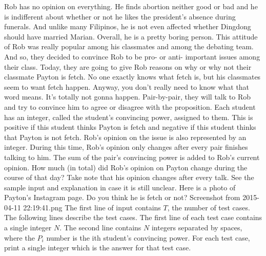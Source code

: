 Rob has no opinion on everything. He finds abortion neither good or bad and he is indifferent about whether or not he likes the president's absence during funerals. And unlike many Filipinos, he is not even affected whether Dingdong should have married Marian. Overall, he is a pretty boring person.
\newline\newline
This attitude of Rob was really popular among his classmates and among the debating team. And so, they decided to convince Rob to be pro- or anti- important issues among their class. Today, they are going to give Rob reasons on why or why not their classmate Payton is fetch. No one exactly knows what fetch is, but his classmates seem to want fetch happen. Anyway, you don't really need to know what that word means. It's totally not gonna happen.
\newline\newline
Pair-by-pair, they will talk to Rob and try to convince him to agree or disagree with the proposition. Each student has an integer, called the student's convincing power, assigned to them. This is positive if this student thinks Payton is fetch and negative if this student thinks that Payton is not fetch. Rob's opinion on the issue is also represented by an integer. During this time, Rob's opinion only changes after every pair finishes talking to him. The sum of the pair's convincing power is added to Rob's current opinion.
\newline\newline
How much (in total) did Rob's opinion on Payton change during the course of that day? Take note that his opinion changes after every talk. See the sample input and explanation in case it is still unclear.
\newline\newline
Here is a photo of Payton's Instagram page. Do you think he is fetch or not? Screenshot from 2015-04-11 22:19:41.png
\newline\newline
The first line of input contains $T$, the number of test cases. The following lines describe the test cases. The first line of each test case contains a single integer $N$. The second line contains $N$ integers separated by spaces, where the $P_i$ number is the ith student's convincing power.
\newline\newline
For each test case, print a single integer which is the answer for that test case.